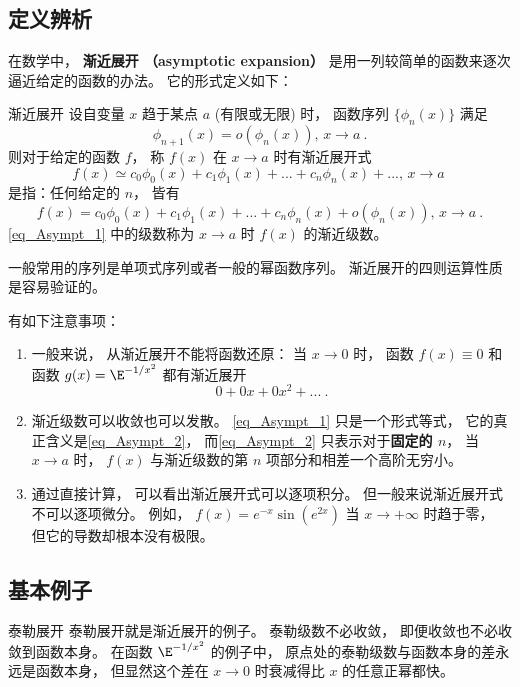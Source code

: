 

\subsection{定义辨析}\label{sub_Asympt_1}
在数学中， \textbf{渐近展开 （asymptotic expansion）} 是用一列较简单的函数来逐次逼近给定的函数的办法。 它的形式定义如下：

\begin{definition}{渐近展开}
设自变量 $x$ 趋于某点 $a$ (有限或无限) 时， 函数序列 $\{\phi_{n}(x)\}$ 满足
$$
\phi_{n+1}(x)=o(\phi_n(x)),\,x\to a~.
$$
则对于给定的函数 $f$， 称 $f(x)$ 在 $x\to a$ 时有渐近展开式
\begin{equation}\label{eq_Asympt_1}
f(x)\simeq c_0\phi_0(x)+c_1\phi_1(x)+...+c_n\phi_n(x)+...,\,x\to a~
\end{equation}
是指：任何给定的 $n$， 皆有
\begin{equation}\label{eq_Asympt_2}
f(x)=c_0\phi_0(x)+c_1\phi_1(x)+...+c_n\phi_n(x)+o(\phi_n(x)),\,x\to a~.
\end{equation}
\autoref{eq_Asympt_1} 中的级数称为 $x\to a$ 时 $f(x)$ 的渐近级数。
\end{definition}

一般常用的序列是单项式序列或者一般的幂函数序列。 渐近展开的四则运算性质是容易验证的。

有如下注意事项：
\begin{enumerate}
\item 一般来说， 从渐近展开不能将函数还原： 当 $x\to0$ 时， 函数 $f(x)\equiv 0$ 和函数 $g(x)=\E^{-1/x^2}$ 都有渐近展开
$$
0+0x+0x^2+...~.
$$
\item 渐近级数可以收敛也可以发散。 \autoref{eq_Asympt_1} 只是一个形式等式， 它的真正含义是\autoref{eq_Asympt_2}，  而\autoref{eq_Asympt_2} 只表示对于\textbf{固定的 $n$}， 当 $x\to a$ 时， $f(x)$ 与渐近级数的第 $n$ 项部分和相差一个高阶无穷小。 

\item 通过直接计算， 可以看出渐近展开式可以逐项积分。 但一般来说渐近展开式不可以逐项微分。 例如， $f(x)=e^{-x}\sin(e^{2x})$ 当 $x\to+\infty$ 时趋于零， 但它的导数却根本没有极限。
\end{enumerate}

\subsection{基本例子}
\begin{example}{泰勒展开}
泰勒展开就是渐近展开的例子。 泰勒级数不必收敛， 即便收敛也不必收敛到函数本身。 在函数 $\E^{-1/x^2}$ 的例子中， 原点处的泰勒级数与函数本身的差永远是函数本身， 但显然这个差在 $x\to0$ 时衰减得比 $x$ 的任意正幂都快。
\end{example}

